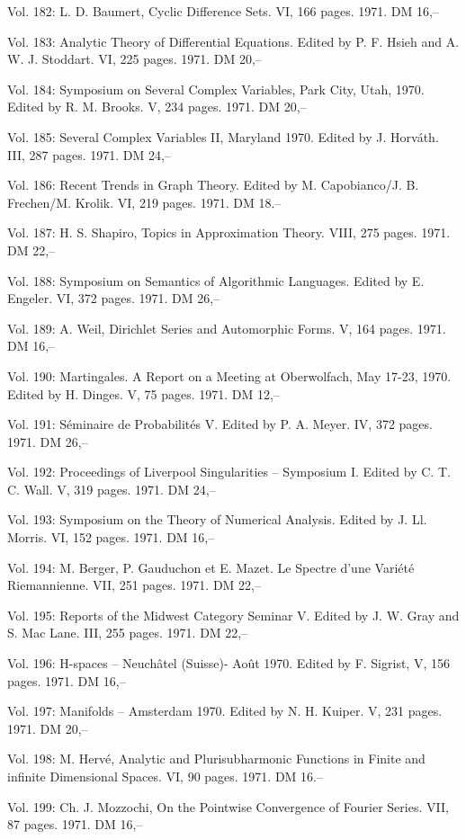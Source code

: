 Vol. 182: L. D. Baumert, Cyclic Difference Sets. VI, 166 pages. 1971. DM 16,--

Vol. 183: Analytic Theory of Differential Equations. Edited by P. F. Hsieh and A. W. J. Stoddart. VI, 225 pages. 1971. DM 20,--

Vol. 184: Symposium on Several Complex Variables, Park City, Utah, 1970. Edited by R. M. Brooks. V, 234 pages. 1971. DM 20,--

Vol. 185: Several Complex Variables II, Maryland 1970. Edited by J. Horváth. III, 287 pages. 1971. DM 24,--

Vol. 186: Recent Trends in Graph Theory. Edited by M. Capobianco/J. B. Frechen/M. Krolik. VI, 219 pages. 1971. DM 18.--

Vol. 187: H. S. Shapiro, Topics in Approximation Theory. VIII, 275 pages. 1971. DM 22,--

Vol. 188: Symposium on Semantics of Algorithmic Languages. Edited by E. Engeler. VI, 372 pages. 1971. DM 26,--

Vol. 189: A. Weil, Dirichlet Series and Automorphic Forms. V, 164 pages. 1971. DM 16,--

Vol. 190: Martingales. A Report on a Meeting at Oberwolfach, May 17-23, 1970. Edited by H. Dinges. V, 75 pages. 1971. DM 12,--

Vol. 191: Séminaire de Probabilités V. Edited by P. A. Meyer. IV, 372 pages. 1971. DM 26,--

Vol. 192: Proceedings of Liverpool Singularities -- Symposium I. Edited by C. T. C. Wall. V, 319 pages. 1971. DM 24,--

Vol. 193: Symposium on the Theory of Numerical Analysis. Edited by J. Ll. Morris. VI, 152 pages. 1971. DM 16,--

Vol. 194: M. Berger, P. Gauduchon et E. Mazet. Le Spectre d'une Variété Riemannienne. VII, 251 pages. 1971. DM 22,--

Vol. 195: Reports of the Midwest Category Seminar V. Edited by J. W. Gray and S. Mac Lane. III, 255 pages. 1971. DM 22,--

Vol. 196: H-spaces -- Neuchâtel (Suisse)- Août 1970. Edited by F. Sigrist, V, 156 pages. 1971. DM 16,--

Vol. 197: Manifolds -- Amsterdam 1970. Edited by N. H. Kuiper. V, 231 pages. 1971. DM 20,--

Vol. 198: M. Hervé, Analytic and Plurisubharmonic Functions in Finite and infinite Dimensional Spaces. VI, 90 pages. 1971. DM 16.--

Vol. 199: Ch. J. Mozzochi, On the Pointwise Convergence of Fourier Series. VII, 87 pages. 1971. DM 16,--

